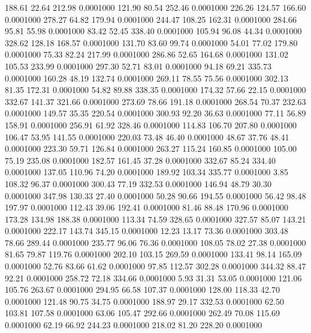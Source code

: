  188.61   22.64  212.98   0.0001000
 121.90   80.54  252.46   0.0001000
 226.26  124.57  166.60   0.0001000
 278.27   64.82  179.94   0.0001000
 244.47  108.25  162.31   0.0001000
 284.66   95.81   55.98   0.0001000
  83.42   52.45  338.40   0.0001000
 105.94   96.08   44.34   0.0001000
 328.62  128.18  168.57   0.0001000
 131.70   83.60   99.74   0.0001000
  54.01   77.02  179.80   0.0001000
  75.33   82.24  217.99   0.0001000
 286.86   52.65  164.68   0.0001000
 131.02  105.53  233.99   0.0001000
 297.30   52.71   83.01   0.0001000
  94.18   69.21  335.73   0.0001000
 160.28   48.19  132.74   0.0001000
 269.11   78.55   75.56   0.0001000
 302.13   81.35  172.31   0.0001000
  54.82   89.88  338.35   0.0001000
 174.32   57.66   22.15   0.0001000
 332.67  141.37  321.66   0.0001000
 273.69   78.66  191.18   0.0001000
 268.54   70.37  232.63   0.0001000
 149.57   35.35  220.54   0.0001000
 300.93   92.20   36.63   0.0001000
  77.11   56.89  158.91   0.0001000
 256.91   61.92  328.46   0.0001000
 114.83  106.70  207.80   0.0001000
 106.47   53.95  141.55   0.0001000
 220.03   73.48   46.40   0.0001000
  48.67   37.76   48.41   0.0001000
 223.30   59.71  126.84   0.0001000
 263.27  115.24  160.85   0.0001000
 105.00   75.19  235.08   0.0001000
 182.57  161.45   37.28   0.0001000
 332.67   85.24  334.40   0.0001000
 137.05  110.96   74.20   0.0001000
 189.92  103.34  335.77   0.0001000
   3.85  108.32   96.37   0.0001000
 300.43   77.19  332.53   0.0001000
 146.94   48.79   30.30   0.0001000
 347.98  130.33   27.40   0.0001000
  50.28   90.66  194.55   0.0001000
  56.42   98.48  197.97   0.0001000
 112.43   39.06  192.41   0.0001000
  81.46   88.48  170.96   0.0001000
 173.28  134.98  188.38   0.0001000
 113.34   74.59  328.65   0.0001000
 327.57   85.07  143.21   0.0001000
 222.17  143.74  345.15   0.0001000
  12.23   13.17   73.36   0.0001000
 303.48   78.66  289.44   0.0001000
 235.77   96.06   76.36   0.0001000
 108.05   78.02   27.38   0.0001000
  81.65   79.87  119.76   0.0001000
 202.10  103.15  269.59   0.0001000
 133.41   98.14  165.09   0.0001000
  52.76   83.66   61.62   0.0001000
  97.85  112.57  302.28   0.0001000
 344.32   88.47   92.21   0.0001000
 258.72   72.18  334.66   0.0001000
   5.93   31.31   53.05   0.0001000
 121.06  105.76  263.67   0.0001000
 294.95   66.58  107.37   0.0001000
 128.00  118.33   42.70   0.0001000
 121.48   90.75   34.75   0.0001000
 188.97   29.17  332.53   0.0001000
  62.50  103.81  107.58   0.0001000
  63.06  105.47  292.66   0.0001000
 262.49   70.08  115.69   0.0001000
  62.19   66.92  244.23   0.0001000
 218.02   81.20  228.20   0.0001000
